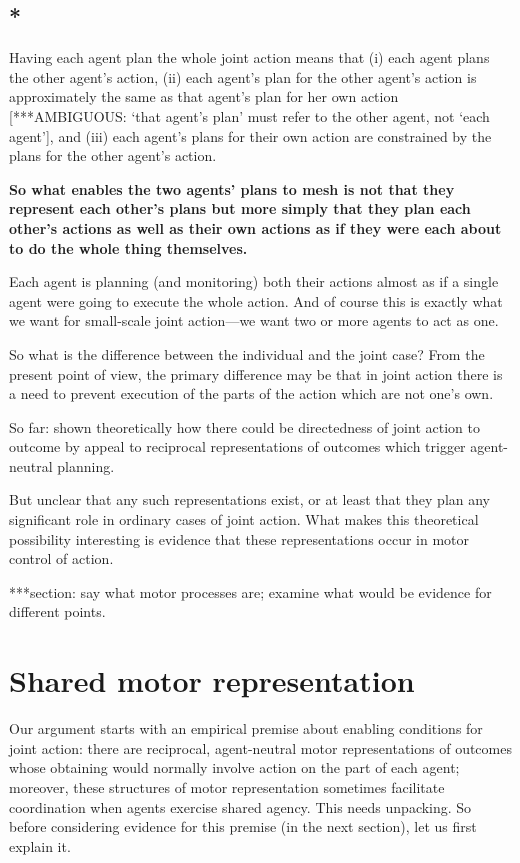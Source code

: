\documentclass[12pt,\papersize]{extarticle}
\begin{document}
\subsection{*}
Having each agent plan the whole joint action means that (i) each agent plans the other agent's action,
(ii) each agent's plan for the other agent's action is approximately the same as that agent's plan for her own action [***AMBIGUOUS: `that agent's plan' must refer to the other agent, not `each agent'],
and 
(iii) each  agent's plans for their own action are constrained by the plans for the other agent's action.

\textbf{So what enables the two agents' plans to mesh is not that they represent each other's plans but more simply that they plan each other's actions as well as their own actions as if they were each about to do the whole thing themselves.}

Each agent is planning (and monitoring) both their actions almost as if a single agent were going to execute the whole action.
And of course this is exactly what we want for small-scale joint action---we want two or more agents to act as one.

So what is the difference between the individual and the joint case?  From the present point of view, the primary difference may be that in joint action there is a need to prevent execution of the parts of the action which are not one’s own.

So far: shown theoretically how there could be directedness of joint action to outcome by appeal to reciprocal representations of outcomes which trigger agent-neutral planning.

But unclear that any such representations exist, or at least that they plan any significant role in ordinary cases of joint action.
What makes this theoretical possibility interesting is evidence that these representations occur in motor control of action.

***section: say what motor processes are; examine what would be evidence for different points.


\section{Shared motor representation}
Our argument starts with an empirical premise about enabling conditions for joint action: there are reciprocal, agent-neutral motor representations of outcomes whose obtaining would normally involve action on the part of each agent;
moreover, these structures of motor representation sometimes facilitate coordination when agents exercise shared agency.
This needs unpacking. 
So before considering evidence for this premise (in the next section), let us first explain  it.
\end{document}

